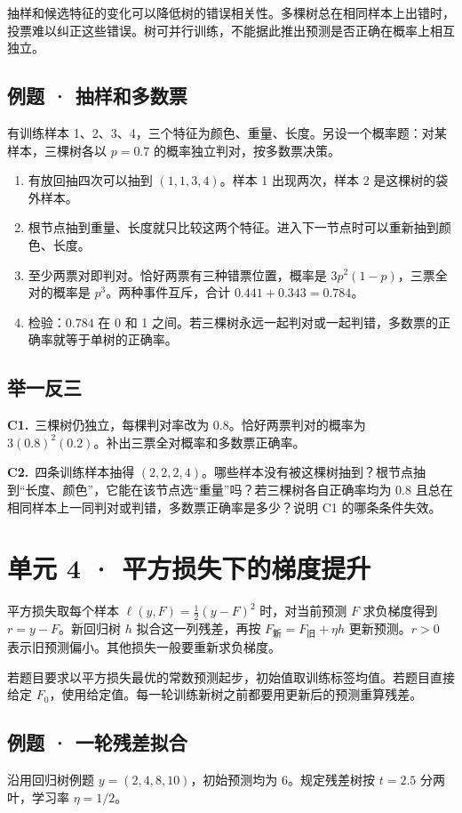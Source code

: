 \documentclass[UTF8,a4paper,11pt]{ctexart}
\newcommand{\PracticeQuestion}[3]{\par\Needspace{4\baselineskip}\noindent\begin{minipage}{\linewidth}\textbf{#1.}\ #2\par\noindent\rule{0pt}{#3mm}\par\end{minipage}\par}
\begin{document}
抽样和候选特征的变化可以降低树的错误相关性。多棵树总在相同样本上出错时，投票难以纠正这些错误。树可并行训练，不能据此推出预测是否正确在概率上相互独立。

\subsection{例题 · 抽样和多数票}
有训练样本 1、2、3、4，三个特征为颜色、重量、长度。另设一个概率题：对某样本，三棵树各以 $p=0.7$ 的概率独立判对，按多数票决策。

\begin{enumerate}
\item 有放回抽四次可以抽到 $(1,1,3,4)$。样本 1 出现两次，样本 2 是这棵树的袋外样本。
\item 根节点抽到重量、长度就只比较这两个特征。进入下一节点时可以重新抽到颜色、长度。
\item 至少两票对即判对。恰好两票有三种错票位置，概率是 $3p^2(1-p)$，三票全对的概率是 $p^3$。两种事件互斥，合计 $0.441+0.343=0.784$。
\item 检验：$0.784$ 在 0 和 1 之间。若三棵树永远一起判对或一起判错，多数票的正确率就等于单树的正确率。
\end{enumerate}
\subsection{举一反三}
\PracticeQuestion{C1}{三棵树仍独立，每棵判对率改为 0.8。恰好两票判对的概率为 $3(0.8)^2(0.2)$。补出三票全对概率和多数票正确率。}{27}
\PracticeQuestion{C2}{四条训练样本抽得 $(2,2,2,4)$。哪些样本没有被这棵树抽到？根节点抽到“长度、颜色”，它能在该节点选“重量”吗？若三棵树各自正确率均为 0.8 且总在相同样本上一同判对或判错，多数票正确率是多少？说明 C1 的哪条条件失效。}{35}
\clearpage
\section{单元 4 · 平方损失下的梯度提升}
平方损失取每个样本 $\ell(y,F)=\tfrac12(y-F)^2$ 时，对当前预测 $F$ 求负梯度得到 $r=y-F$。新回归树 $h$ 拟合这一列残差，再按 $F_{\text{新}}=F_{\text{旧}}+\eta h$ 更新预测。$r>0$ 表示旧预测偏小。其他损失一般要重新求负梯度。

若题目要求以平方损失最优的常数预测起步，初始值取训练标签均值。若题目直接给定 $F_0$，使用给定值。每一轮训练新树之前都要用更新后的预测重算残差。

\subsection{例题 · 一轮残差拟合}
沿用回归树例题 $y=(2,4,8,10)$，初始预测均为 6。规定残差树按 $t=2.5$ 分两叶，学习率 $\eta=1/2$。
\end{document}
